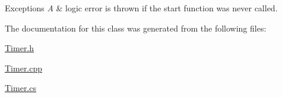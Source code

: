 \begin{DoxyExceptions}{Exceptions}
{\em A} & logic error is thrown if the start function was never called. \\
\hline
\end{DoxyExceptions}


The documentation for this class was generated from the following files\-:\begin{DoxyCompactItemize}
\item 
\hyperlink{_timer_8h}{Timer.\-h}\item 
\hyperlink{_timer_8cpp}{Timer.\-cpp}\item 
\hyperlink{_timer_8cs}{Timer.\-cs}\end{DoxyCompactItemize}
